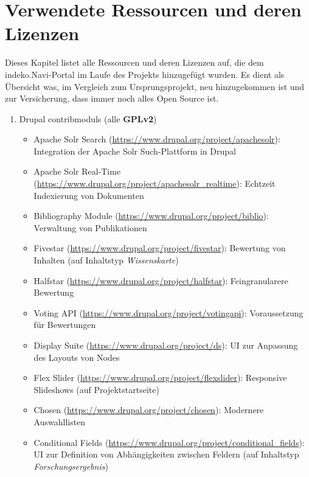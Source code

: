 \newpage
\section{Verwendete Ressourcen und deren Lizenzen}\label{sub:license}
Dieses Kapitel listet alle Ressourcen und deren Lizenzen auf, die dem \acrshort{indeko}.Navi-Portal im Laufe des Projekts hinzugefügt wurden. Es dient als Übersicht was, im Vergleich zum Ursprungsprojekt, neu hinzugekommen ist und zur Versicherung, dass immer noch alles Open Source ist.

\begin{enumerate}[parsep=0pt, itemsep=5.0pt plus 2.0pt minus 1.0pt, leftmargin=*]
	\item Drupal \glspl{contribmodul} (alle \textbf{GPLv2})
	\begin{itemize}
		\item Apache Solr Search (\url{https://www.drupal.org/project/apachesolr}):
		Integration der Apache Solr Such-Plattform in Drupal

		\item Apache Solr Real-Time (\url{https://www.drupal.org/project/apachesolr_realtime}):
		Echtzeit Indexierung von Dokumenten

		\item Bibliography Module (\url{https://www.drupal.org/project/biblio}):
		Verwaltung von Publikationen

		\item Fivestar (\url{https://www.drupal.org/project/fivestar}):
		Bewertung von Inhalten (\zB auf Inhaltstyp \textit{Wissenskarte})

		\item Halfstar (\url{https://www.drupal.org/project/halfstar}):
		Feingranularere Bewertung

		\item Voting API (\url{https://www.drupal.org/project/votingapi}):
		Voraussetzung für Bewertungen

		\item Display Suite (\url{https://www.drupal.org/project/ds}):
		UI zur Anpassung des Layouts von Nodes

		\item Flex Slider (\url{https://www.drupal.org/project/flexslider}):
		Responsive Slideshows (\zB auf Projektstartseite)

		\item Chosen (\url{https://www.drupal.org/project/chosen}):
		Modernere Auswahllisten

		\item Conditional Fields (\url{https://www.drupal.org/project/conditional_fields}):
		UI zur Definition von Abhängigkeiten zwischen Feldern (\zB auf Inhaltstyp \textit{Forschungsergebnis})


\end{itemize}
\end{enumerate}
